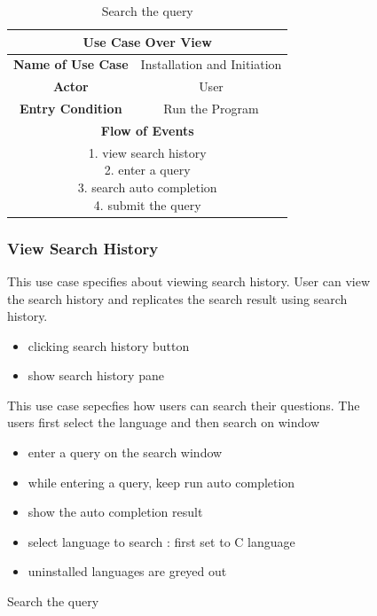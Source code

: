 \documentclass[conference]{IEEEtran}
\begin{document}
\begin{itemize}
\begin{itemize}
\begin{itemize}
\begin{itemize}
\begin{figure}[h]
\begin{enumerate}
\begin{itemize}
\begin{enumerate}
\begin{table}[hbt]
\renewcommand{\arraystretch}{1}
\caption{Search the query}
\label{table:usecase2}
\centering
\begin{adjustbox}{width=0.4\textwidth}
\small
\begin{tabular}{c|c}
\hline
\multicolumn{2}{c}{\textbf{Use Case Over View}} \\
\hline
\textbf{Name of Use Case} & Installation and Initiation \\
\hline
\textbf{Actor} & User \\
\hline
\textbf{Entry Condition} & Run the Program\\
\hline
\multicolumn{2}{c}{\textbf{Flow of Events}}\\
\hline
\multicolumn{2}{c}{
\parbox[t]{5cm}{
  1. view search history \\
  2. enter a query \\
  3. search auto completion \\
  4. submit the query
  }
}\\
\hline

\end{tabular}
\end{adjustbox}
\end{table}


\subsubsection{View Search History}
This use case specifies about viewing search history. User can view the search history and replicates the search result using search history.
\begin{itemize}
  \item clicking search history button
  \item show search history pane
\end{itemize}
\textit{}
This use case sepecfies how users can search their questions. The users first select the language and then search on window
\begin{itemize}
  \item enter a query on the search window
  \item while entering a query, keep run auto completion
  \item show the auto completion result
  \item select language to search : first set to C language
  \item uninstalled languages are greyed out
\end{itemize}
\textit{}



\end{enumerate}
\end{itemize}
\end{enumerate}
\end{figure}
\end{itemize}
\end{itemize}
\end{itemize}
\end{itemize}
\end{document}
